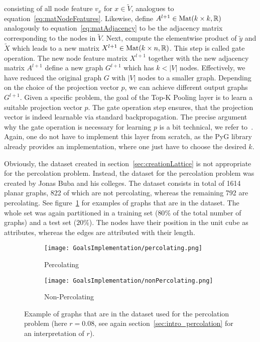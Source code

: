 consisting of all node feature $v_x$ for $x\in\tilde{V}$, analogues to equation~\ref{eq:matNodeFeatures}. 
Likewise, define $A^{l+1}\in\text{Mat}(k\times k,\mathbb{R})$ analogously to equation~\ref{eq:matAdjacency}
to be the adjacency matrix corresponding to the nodes in $\tilde{V}$.
Next, compute the elementwise product of $\tilde{y}$ and $\tilde{X}$ which leads to a new matrix
$X^{l+1}\in\text{Mat}(k\times n,\mathbb{R})$. This step is called \glqq{}gate operation\grqq{}.
The new node feature matrix $X^{l+1}$ together with the new adjacency matrix $A^{l+1}$
define a new graph $G^{l+1}$ which has $k<|V|$ nodes. Effectively, we have reduced the original graph $G$ with
$|V|$ nodes to a smaller graph. Depending on the choice of the projection vector $p$, we can
achieve different output graphs $G^{l+1}$. Given a specific problem, the goal of the 
Top-K Pooling layer is to learn a suitable projection vector $p$.
The gate operation step ensures, that the projection vector is indeed learnable via standard backpropagation.
The precise argument why the gate operation is necessary for learning $p$ is a bit technical, we refer to~\cite{topKPooling}.
Again, one do not have to implement this layer from scratch, as the PyG library already provides an implementation, where one 
just have to choose the desired $k$.

Obviously, the dataset created in section~\ref{sec:creationLattice} is not appropriate
for the percolation problem. Instead, the dataset for the percolation problem was created by Jonas Buba and his 
colleges. The dataset consists in total of 1614 planar graphs, 822 of which are not percolating, whereas
the remaining 792 are percolating. See figure~\ref{fig:expPercNonPerc} for examples of graphs that are in the dataset.
The whole set was again partitioned in a training set ($80\%$ of the total number of graphs)
and a test set ($20\%$). The nodes have their position in the unit cube as attributes, whereas the edges are attributed with their length.
\begin{figure}[h]
    \centering
    \begin{subfigure}[t]{0.45\textwidth}
        \centering
        \texttt{[image: GoalsImplementation/percolating.png]}
        \caption{Percolating}
    \end{subfigure}
    \hfill
    \begin{subfigure}[t]{0.45\textwidth}
        \centering
        \texttt{[image: GoalsImplementation/nonPercolating.png]}
        \caption{Non-Percolating}
    \end{subfigure}
    \caption{Example of graphs that are in the dataset used for the percolation problem 
    (here $r=0.08$, see again section~\ref{sec:intro_percolation} for an interpretation of $r$).}
    \label{fig:expPercNonPerc}
\end{figure}